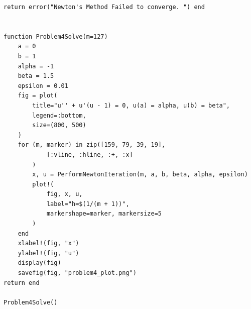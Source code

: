 \documentclass[]{article}
\begin{document}
\begin{lstlisting}
return error("Newton's Method Failed to converge. ") end


function Problem4Solve(m=127)
    a = 0
    b = 1
    alpha = -1 
    beta = 1.5
    epsilon = 0.01
    fig = plot(
        title="u'' + u'(u - 1) = 0, u(a) = alpha, u(b) = beta",
        legend=:bottom,
        size=(800, 500)
    )
    for (m, marker) in zip([159, 79, 39, 19], 
            [:vline, :hline, :+, :x]
        )
        x, u = PerformNewtonIteration(m, a, b, beta, alpha, epsilon)
        plot!(
            fig, x, u, 
            label="h=$(1/(m + 1))", 
            markershape=marker, markersize=5
        )
    end
    xlabel!(fig, "x")
    ylabel!(fig, "u")
    display(fig)
    savefig(fig, "problem4_plot.png")
return end

Problem4Solve()

        \end{lstlisting}
    
\end{document}
